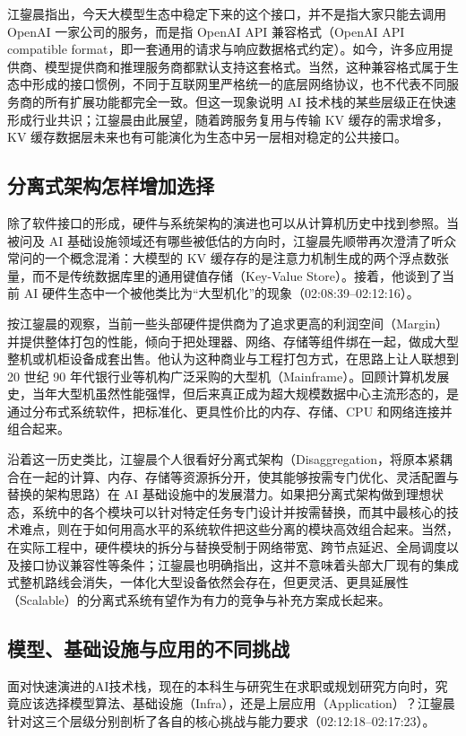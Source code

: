 \documentclass[UTF8,a4paper,11pt,fontset=fandol]{ctexart}
\begin{document}
江鋆晨指出，今天大模型生态中稳定下来的这个接口，并不是指大家只能去调用 OpenAI 一家公司的服务，而是指 OpenAI API 兼容格式（OpenAI API compatible format，即一套通用的请求与响应数据格式约定）。如今，许多应用提供商、模型提供商和推理服务商都默认支持这套格式。当然，这种兼容格式属于生态中形成的接口惯例，不同于互联网里严格统一的底层网络协议，也不代表不同服务商的所有扩展功能都完全一致。但这一现象说明 AI 技术栈的某些层级正在快速形成行业共识；江鋆晨由此展望，随着跨服务复用与传输 KV 缓存的需求增多，KV 缓存数据层未来也有可能演化为生态中另一层相对稳定的公共接口。

\subsection{分离式架构怎样增加选择}
除了软件接口的形成，硬件与系统架构的演进也可以从计算机历史中找到参照。当被问及 AI 基础设施领域还有哪些被低估的方向时，江鋆晨先顺带再次澄清了听众常问的一个概念混淆：大模型的 KV 缓存存的是注意力机制生成的两个浮点数张量，而不是传统数据库里的通用键值存储（Key-Value Store）。接着，他谈到了当前 AI 硬件生态中一个被他类比为“大型机化”的现象（02:08:39–02:12:16）。

按江鋆晨的观察，当前一些头部硬件提供商为了追求更高的利润空间（Margin）并提供整体打包的性能，倾向于把处理器、网络、存储等组件绑在一起，做成大型整机或机柜设备成套出售。他认为这种商业与工程打包方式，在思路上让人联想到 20 世纪 90 年代银行业等机构广泛采购的大型机（Mainframe）。回顾计算机发展史，当年大型机虽然性能强悍，但后来真正成为超大规模数据中心主流形态的，是通过分布式系统软件，把标准化、更具性价比的内存、存储、CPU 和网络连接并组合起来。

沿着这一历史类比，江鋆晨个人很看好分离式架构（Disaggregation，将原本紧耦合在一起的计算、内存、存储等资源拆分开，使其能够按需专门优化、灵活配置与替换的架构思路）在 AI 基础设施中的发展潜力。如果把分离式架构做到理想状态，系统中的各个模块可以针对特定任务专门设计并按需替换，而其中最核心的技术难点，则在于如何用高水平的系统软件把这些分离的模块高效组合起来。当然，在实际工程中，硬件模块的拆分与替换受制于网络带宽、跨节点延迟、全局调度以及接口协议兼容性等条件；江鋆晨也明确指出，这并不意味着头部大厂现有的集成式整机路线会消失，一体化大型设备依然会存在，但更灵活、更具延展性（Scalable）的分离式系统有望作为有力的竞争与补充方案成长起来。

\subsection{模型、基础设施与应用的不同挑战}
面对快速演进的AI技术栈，现在的本科生与研究生在求职或规划研究方向时，究竟应该选择模型算法、基础设施（Infra），还是上层应用（Application）？江鋆晨针对这三个层级分别剖析了各自的核心挑战与能力要求（02:12:18–02:17:23）。
\end{document}
